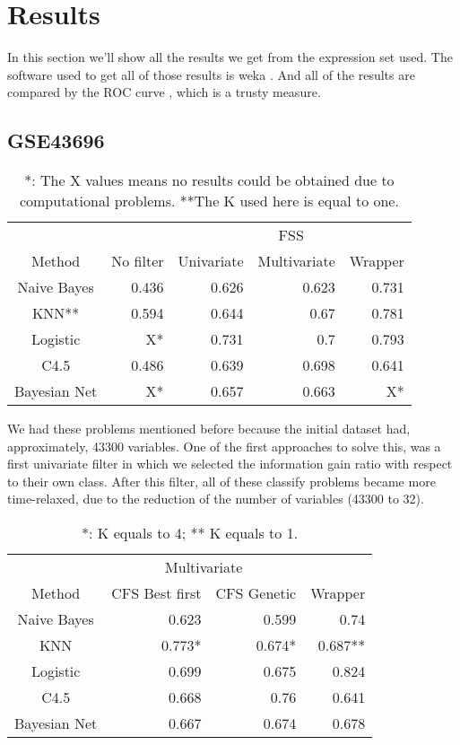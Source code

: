 \documentclass[conference,a4paper]{IEEEtran}
\begin{document}
\section{Results}


In this section we'll show all the results we get from the expression set used. The software used to get all of those results is weka \cite{weka}. And all of the results are compared by the ROC curve \cite{ROC}, which is a trusty measure.

\subsection{GSE43696}

\begin{table}[h]
	\caption{*: The X values means no results could be obtained due to computational problems. **The K used here is equal to one.}
	\centering
	\begin{tabular}{c r r r r}
		\hline
		& & \multicolumn{3}{|c}{FSS} \\
		Method & No filter & \multicolumn{1}{|c}{Univariate} & Multivariate & Wrapper\\ [0.2ex]
		\hline
		Naive Bayes & 0.436 & 0.626 & 0.623 & 0.731 \\
		KNN** & 0.594 & 0.644 & 0.67 & 0.781 \\
		Logistic &  X* & 0.731 & 0.7 & 0.793\\
		C4.5 & 0.486 & 0.639 & 0.698 & 0.641\\
		Bayesian Net & X* & 0.657 & 0.663 & X* \\ [1ex]
		\hline
	\end{tabular}
	
\label{table:basicsResults}
\end{table}

We had these problems mentioned before because the initial dataset had, approximately, 43300 variables. One of the first approaches to solve this, was a first univariate filter in which we selected the information gain ratio with respect to their own class. After this filter, all of these classify problems became more time-relaxed, due to the reduction of the number of variables (43300 to 32).

\begin{table}[h]
	\caption{*: K equals to 4; ** K equals to 1.}
	\centering
	\begin{tabular}{c r r r}
		\hline\hline
		& \multicolumn{2}{c}{Multivariate} & \\
		Method & CFS Best first & CFS Genetic & Wrapper\\ [0.2ex]
		\hline
		Naive Bayes & 0.623 & 0.599 & 0.74 \\
		KNN & 0.773* & 0.674* & 0.687** \\
		Logistic & 0.699 & 0.675 & 0.824 \\
		C4.5 & 0.668 & 0.76 & 0.641 \\
		Bayesian Net & 0.667 & 0.674 & 0.678 \\ [1ex]
		\hline
	\end{tabular}
	\label{table:filteredResults}
\end{table}
\end{document}
